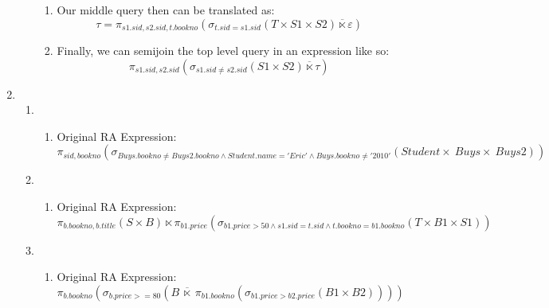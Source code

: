 \documentclass{article}
\begin{document}
\begin{enumerate}
\begin{enumerate}
\begin{enumerate}
            \item Our middle query then can be translated as:
            \begin{displaymath}
                \tau = \pi_{s1.sid, s2.sid, t.bookno}(\sigma_{t.sid=s1.sid}(T \times S1 \times S2) \overline{\ltimes} \varepsilon)
            \end{displaymath}

            \item Finally, we can semijoin the top level query in an expression like so:
            \begin{displaymath}
                \pi_{s1.sid, s2.sid}(\sigma_{s1.sid \ne s2.sid}(S1 \times S2) \overline{\ltimes} \tau)
            \end{displaymath}


        \end{enumerate}

    \end{enumerate}

    \item  %
    \begin{enumerate}

    \item %
    \begin{enumerate}
        \item %
        Original RA Expression:
        \begin{displaymath}
            \pi_{sid, bookno}
                (\sigma_{Buys.bookno \ne Buys2.bookno \wedge Student.name='Eric' \wedge Buys.bookno \ne '2010'}
                    (Student \times\ Buys \times\ Buys2))
            \end{displaymath}
    \end{enumerate}


    \item %
    \begin{enumerate}
        \item Original RA Expression: %
        \begin{displaymath}
            \pi_{b.bookno, b.title}(S \times B) \ltimes
            \pi_{b1.price}(
                \sigma_{b1.price>50 \wedge s1.sid=t.sid \wedge t.bookno=b1.bookno}(T \times B1 \times S1
                ))
        \end{displaymath}
    \end{enumerate}


    \item %
    \begin{enumerate}
        \item Original RA Expression: %
        \begin{displaymath}
            \pi_{b.bookno}(\sigma_{b.price >= 80}(B \ \overline{\ltimes}\ \pi_{b1.bookno}(\sigma_{b1.price>b2.price}(B1 \times B2))))
        \end{displaymath}
    \end{enumerate}


\end{enumerate}
\end{enumerate}
\end{document}
